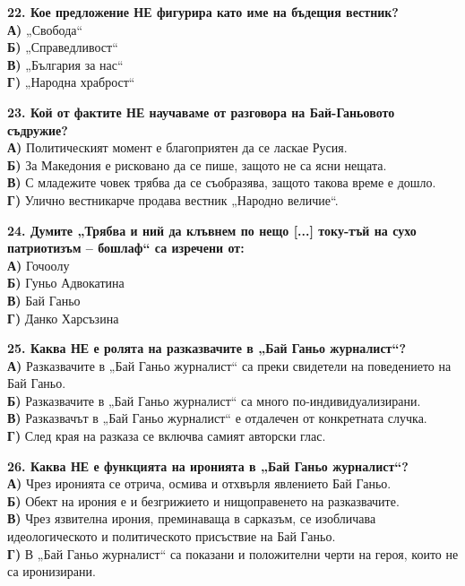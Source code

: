 \documentclass[12pt,a4paper]{article}
\begin{document}
{{{{{{{{{{{{\vspace{0.6cm}

\noindent
\textbf{22. Кое предложение НЕ фигурира като име на бъдещия вестник?} \\
\textbf{А)} „Свобода“ \\
\textbf{Б)} „Справедливост“ \\
\textbf{В)} „България за нас“ \\
\textbf{Г)} „Народна храброст“

\vspace{0.6cm}

\noindent
\textbf{23. Кой от фактите НЕ научаваме от разговора на Бай-Ганьовото съдружие?} \\
\textbf{А)} Политическият момент е благоприятен да се ласкае Русия. \\
\textbf{Б)} За Македония е рисковано да се пише, защото не са ясни нещата. \\
\textbf{В)} С младежите човек трябва да се съобразява, защото такова време е дошло. \\
\textbf{Г)} Улично вестникарче продава вестник „Народно величие“.

\vspace{0.6cm}

\noindent
\textbf{24. Думите „Трябва и ний да клъвнем по нещо [...] току-тъй на сухо патриотизъм – бошлаф“ са изречени от:} \\
\textbf{А)} Гочоолу \\
\textbf{Б)}  Гуньо Адвокатина \\
\textbf{В)} Бай Ганьо \\
\textbf{Г)} Данко Харсъзина

\vspace{0.6cm}

\noindent
\textbf{25. Каква НЕ е ролята на разказвачите в „Бай Ганьо журналист“?} \\
\textbf{А)} Разказвачите в „Бай Ганьо журналист“ са преки свидетели на поведението на Бай Ганьо. \\
\textbf{Б)}  Разказвачите в „Бай Ганьо журналист“ са много по-индивидуализирани. \\
\textbf{В)} Разказвачът в „Бай Ганьо журналист“ е отдалечен от конкретната случка. \\
\textbf{Г)} След края на разказа се включва самият авторски глас.

\vspace{0.6cm}

\noindent
\textbf{26. Каква НЕ е функцията на иронията в „Бай Ганьо журналист“?} \\
\textbf{А)} Чрез иронията се отрича, осмива и отхвърля явлението Бай Ганьо. \\
\textbf{Б)}  Обект на ирония е и безгрижието и нищоправенето на разказвачите. \\
\textbf{В)} Чрез язвителна ирония, преминаваща в сарказъм, се изобличава идеологическото и политическото присъствие на Бай Ганьо. \\
\textbf{Г)} В „Бай Ганьо журналист“ са показани и положителни черти на героя, които не са иронизирани.

}}}}}}}}}}}}
\end{document}
